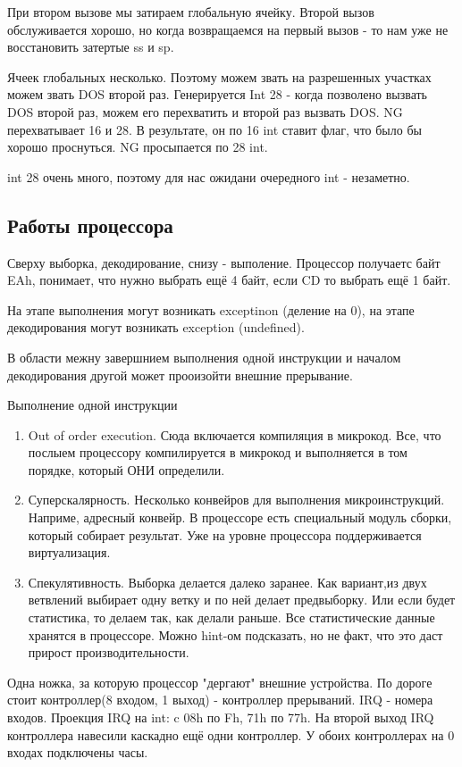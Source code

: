 При втором вызове мы затираем глобальную ячейку. Второй вызов обслуживается хорошо, но когда возвращаемся на первый вызов - то нам уже не восстановить затертые ss и sp.

Ячеек глобальных несколько. Поэтому можем звать на разрешенных участках можем звать DOS второй раз. Генерируется Int 28 - когда позволено вызвать DOS второй раз, можем его перехватить и второй раз вызвать DOS. NG перехватывает 16 и 28. В результате, он по 16 int ставит флаг, что было бы хорошо проснуться. NG просыпается по 28 int.  

int 28 очень много, поэтому для нас ожидани очередного int - незаметно. 


\subsection{Работы процессора}
Сверху выборка, декодирование, снизу - выполение. Процессор получаетс байт EAh, понимает, что нужно выбрать ещё 4 байт, если CD то выбрать ещё 1 байт. 

На этапе выполнения могут возникать exceptinon (деление на 0), на этапе декодирования могут возникать exception (undefined).

В области межну завершнием выполнения одной инструкции и началом декодирования другой может прооизойти внешние прерывание.

Выполнение одной инструкции
\begin{enumerate}
\item Out of order execution. Сюда включается компиляция в микрокод. Все, что послыем процессору компилируется в микрокод и выполняется в том порядке, который ОНИ определили. 
\item Суперскалярность. Несколько конвейров для выполнения микроинструкций. Наприме, адресный конвейр. В процессоре есть специальный модуль сборки, который собирает результат. Уже на уровне процессора поддерживается виртуализация. 
\item Спекулятивность. Выборка делается далеко заранее. Как вариант,из двух ветвлений выбирает одну ветку и по ней делает предвыборку. Или если будет статистика, то делаем так, как делали раньше. Все статистические данные хранятся в процессоре. Можно hint-ом подсказать, но не факт, что это даст прирост производительности. 
\end{enumerate} 

Одна ножка, за которую процессор "дергают" внешние устройства.  По дороге стоит контроллер(8 входом, 1 выход) - контроллер прерываний. IRQ - номера входов. Проекция IRQ на int: c 08h по Fh,
71h по 77h. На второй выход IRQ контроллера навесили каскадно ещё одни контроллер. У обоих контроллерах на 0 входах подключены часы. 

